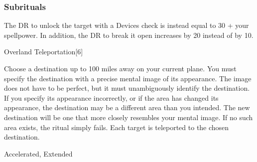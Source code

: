 \subsubsection{Subrituals}
The DR to unlock the target with a Devices check is instead equal to 30 + your spellpower.
In addition, the DR to break it open increases by 20 instead of by 10.
\begin{spellsection}{Overland Teleportation}[6]
\begin{spellcontent}
\begin{spelltargetinginfo}
\end{spelltargetinginfo}
\begin{spelleffects}
\spellspecial
Choose a destination up to 100 miles away on your current plane.
You must specify the destination with a precise mental image of its appearance.
The image does not have to be perfect, but it must unambiguously identify the destination.
If you specify its appearance incorrectly, or if the area has changed its appearance, the destination may be a different area than you intended.
The new destination will be one that more closely resembles your mental image.
If no such area exists, the ritual simply fails.
\spelleffect
Each target is teleported to the chosen destination.
\end{spelleffects}
\end{spellcontent}
\begin{spellfooter}
 Accelerated, Extended
\end{spellfooter}
\begin{spellsubcontent}
\end{spellsubcontent}
\end{spellsection}
